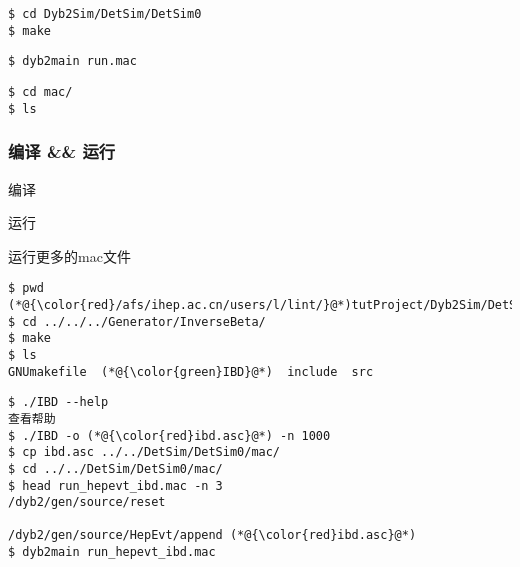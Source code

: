 \newsavebox{\QuickStartDybCompile}
\begin{lrbox}{\QuickStartDybCompile}
\begin{lstlisting}
$ cd Dyb2Sim/DetSim/DetSim0
$ make
\end{lstlisting}
\end{lrbox}

\newsavebox{\QuickStartDybRun}
\begin{lrbox}{\QuickStartDybRun}
\begin{lstlisting}
$ dyb2main run.mac
\end{lstlisting}
\end{lrbox}

\newsavebox{\QuickStartDybRunMore}
\begin{lrbox}{\QuickStartDybRunMore}
\begin{lstlisting}
$ cd mac/
$ ls
\end{lstlisting}
\end{lrbox}

\begin{frame}
    \frametitle{编译 \&\& 运行}
    \begin{block}{编译}
        \par\usebox{\QuickStartDybCompile}
    \end{block}
    \begin{block}{运行}
        \par\usebox{\QuickStartDybRun}
    \end{block}
    \begin{block}{运行更多的mac文件}
        \par\usebox{\QuickStartDybRunMore}
    \end{block}
\end{frame}

\newsavebox{\QuickStartDybGeneratorCompile}
\begin{lrbox}{\QuickStartDybGeneratorCompile}
\begin{lstlisting}
$ pwd
(*@{\color{red}/afs/ihep.ac.cn/users/l/lint/}@*)tutProject/Dyb2Sim/DetSim/DetSim0/mac
$ cd ../../../Generator/InverseBeta/
$ make
$ ls
GNUmakefile  (*@{\color{green}IBD}@*)  include  src
\end{lstlisting}
\end{lrbox}

\newsavebox{\QuickStartDybGeneratorRun}
\begin{lrbox}{\QuickStartDybGeneratorRun}
\begin{lstlisting}
$ ./IBD --help
查看帮助
$ ./IBD -o (*@{\color{red}ibd.asc}@*) -n 1000
$ cp ibd.asc ../../DetSim/DetSim0/mac/
$ cd ../../DetSim/DetSim0/mac/
$ head run_hepevt_ibd.mac -n 3
/dyb2/gen/source/reset

/dyb2/gen/source/HepEvt/append (*@{\color{red}ibd.asc}@*)
$ dyb2main run_hepevt_ibd.mac 
\end{lstlisting}
\end{lrbox}

